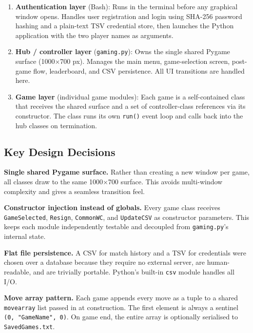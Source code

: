 \documentclass[12pt,a4paper]{article}
\begin{document}
\begin{enumerate}[leftmargin=2em]
  \item \textbf{Authentication layer} (Bash): Runs in the terminal before any graphical window opens. Handles user registration and login using SHA-256 password hashing and a plain-text TSV credential store, then launches the Python application with the two player names as arguments.
  \item \textbf{Hub / controller layer} (\texttt{gaming.py}): Owns the single shared Pygame surface (1000$\times$700 px). Manages the main menu, game-selection screen, post-game flow, leaderboard, and CSV persistence. All UI transitions are handled here.
  \item \textbf{Game layer} (individual game modules): Each game is a self-contained class that receives the shared surface and a set of controller-class references via its constructor. The class runs its own \texttt{run()} event loop and calls back into the hub classes on termination.
\end{enumerate}

\subsection{Key Design Decisions}

\textbf{Single shared Pygame surface.}
Rather than creating a new window per game, all classes draw to the same 1000$\times$700 surface. This avoids multi-window complexity and gives a seamless transition feel.

\textbf{Constructor injection instead of globals.}
Every game class receives \texttt{GameSelected}, \texttt{Resign}, \texttt{CommonWC}, and \texttt{UpdateCSV} as constructor parameters. This keeps each module independently testable and decoupled from \texttt{gaming.py}'s internal state.

\textbf{Flat file persistence.}
A CSV for match history and a TSV for credentials were chosen over a database because they require no external server, are human-readable, and are trivially portable. Python's built-in \texttt{csv} module handles all I/O.

\textbf{Move array pattern.}
Each game appends every move as a tuple to a shared \texttt{movearray} list passed in at construction. The first element is always a sentinel \texttt{(0, "GameName", 0)}. On game end, the entire array is optionally serialised to \texttt{SavedGames.txt}.

\end{document}
